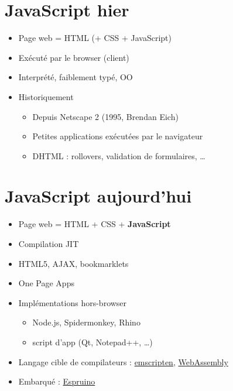 \hypertarget{javascript-hier}{%
\section{JavaScript hier}\label{javascript-hier}}

\begin{itemize}
\tightlist
\item
  Page web = HTML (+ CSS + JavaScript)
\item
  Exécuté par le browser (client)
\item
  Interprété, faiblement typé, OO
\item
  Historiquement

  \begin{itemize}
  \tightlist
  \item
    Depuis Netscape 2 (1995, Brendan Eich)
  \item
    Petites applications exécutées par le navigateur
  \item
    DHTML : rollovers, validation de formulaires, \ldots{}
  \end{itemize}
\end{itemize}

\hypertarget{javascript-aujourdhui}{%
\section{JavaScript aujourd'hui}\label{javascript-aujourdhui}}

\begin{itemize}
\tightlist
\item
  Page web = HTML + CSS + \textbf{JavaScript}
\item
  Compilation JIT
\item
  HTML5, AJAX, bookmarklets
\item
  One Page Apps
\item
  Implémentations hors-browser

  \begin{itemize}
  \tightlist
  \item
    Node.js, Spidermonkey, Rhino
  \item
    script d'app (Qt, Notepad++, \ldots{})
  \end{itemize}
\item
  Langage cible de compilateurs :
  \href{https://github.com/kripken/emscripten/wiki}{emscripten},
  \href{http://webassembly.org/}{WebAssembly}
\item
  Embarqué : \href{http://www.espruino.com/}{Espruino}
\end{itemize}

